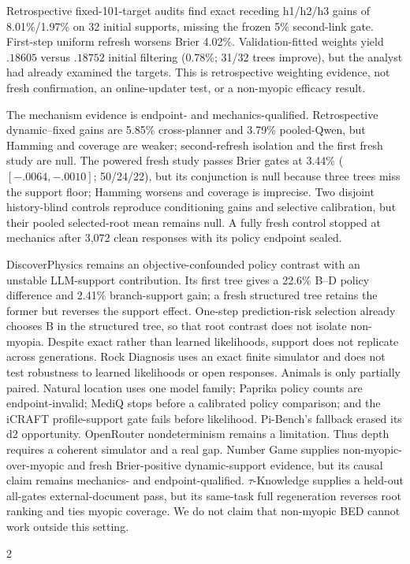 \documentclass[10pt]{article}
\begin{document}
Retrospective fixed-101-target audits find exact receding h1/h2/h3 gains of
8.01\%/1.97\% on 32 initial supports, missing the frozen 5\% second-link gate.
First-step uniform refresh worsens Brier 4.02\%. Validation-fitted weights yield
$.18605$ versus $.18752$ initial filtering (0.78\%; 31/32 trees improve), but
the analyst had already examined the targets. This is retrospective weighting evidence,
not fresh confirmation, an online-updater test, or a non-myopic efficacy result.

The mechanism evidence is endpoint- and mechanics-qualified. Retrospective
dynamic--fixed gains are 5.85\% cross-planner and 3.79\% pooled-Qwen, but
Hamming and coverage are weaker; second-refresh isolation and the first fresh
study are null. The powered fresh study passes Brier gates at 3.44\%
($[-.0064,-.0010]$; 50/24/22), but its conjunction is null because three trees
miss the support floor; Hamming worsens and coverage is imprecise. Two disjoint
history-blind controls reproduce conditioning gains and selective calibration,
but their pooled selected-root mean remains null. A fully fresh control stopped
at mechanics after 3,072 clean responses with its policy endpoint sealed.

DiscoverPhysics remains an objective-confounded policy contrast with an unstable
LLM-support contribution. Its first tree gives a 22.6\% B--D policy difference
and 2.41\% branch-support gain; a fresh structured tree retains the former but
reverses the support effect. One-step prediction-risk selection already chooses
B in the structured tree, so that root contrast does not isolate non-myopia. Despite exact
rather than learned likelihoods, support does not replicate across generations.
Rock Diagnosis uses an exact finite simulator and
does not test robustness to learned likelihoods or open responses. Animals is only partially paired. Natural
location uses one model family; Paprika policy counts are endpoint-invalid;
MediQ stops before a calibrated policy comparison; and the iCRAFT profile-support
gate fails before likelihood. Pi-Bench's fallback erased its d2 opportunity.
OpenRouter nondeterminism remains a limitation. Thus depth requires a coherent
simulator and a real gap. Number Game supplies non-myopic-over-myopic and fresh
Brier-positive dynamic-support evidence, but its causal claim remains mechanics-
and endpoint-qualified. $\tau$-Knowledge supplies a held-out all-gates
external-document pass, but its same-task full regeneration reverses root
ranking and ties myopic coverage. We do not claim that non-myopic BED cannot work outside
this setting.

{\fontsize{6.8}{7.0}\selectfont
\setlength{\bibsep}{0pt}
\begin{multicols}{2}


\end{multicols}
}
\end{document}
